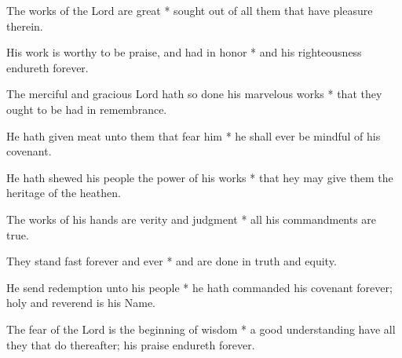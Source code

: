 The works of the Lord are great * sought out of all them that have pleasure therein.
	
His work is worthy to be praise, and had in honor * and his righteousness endureth forever.
	
The merciful and gracious Lord hath so done his marvelous works * that they ought to be had in remembrance.
	
He hath given meat unto them that fear him * he shall ever be mindful of his covenant.
	
He hath shewed his people the power of his works * that hey may give them the heritage of the heathen.
	
The works of his hands are verity and judgment * all his commandments are true.
	
They stand fast forever and ever * and are done in truth and equity.
	
He send redemption unto his people * he hath commanded his covenant forever; holy and reverend is his Name.
	
The fear of the Lord is the beginning of wisdom * a good understanding have all they that do thereafter; his praise endureth forever.